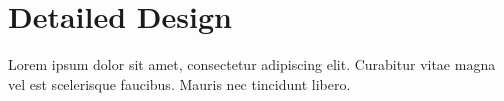 \chapter{Detailed Design}
Lorem ipsum dolor sit amet, consectetur adipiscing elit. Curabitur vitae magna
vel est scelerisque faucibus. Mauris nec tincidunt libero.
